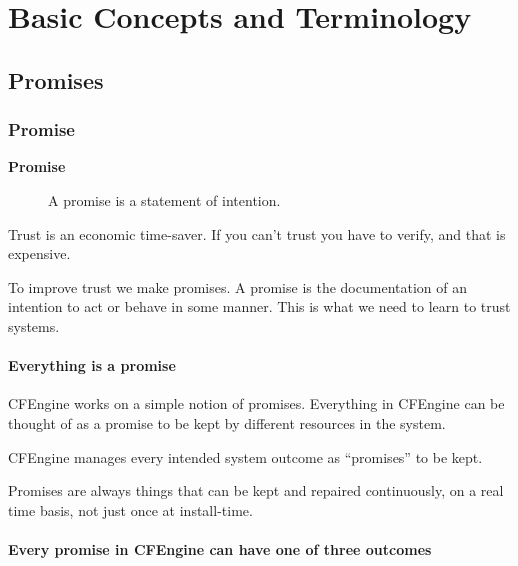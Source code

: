 



\chapter{Basic Concepts and Terminology}





\section{Promises}





\subsection{Promise}

\begin{description}
\item[\textbf{Promise}] A promise is a statement of intention.
\end{description}

Trust is an economic time-saver. If you can't trust you have to verify,
and that is expensive.

To improve trust we make promises. A promise is the documentation of
an intention to act or behave in some manner. This is what we need to
learn to trust systems.





\subsubsection{Everything is a promise}

CFEngine works on a simple notion of promises. Everything in CFEngine
can be thought of as a promise to be kept by different resources in
the system.

CFEngine manages every intended system outcome as ``promises'' to be kept.

Promises are always things that can be kept and repaired continuously,
on a real time basis, not just once at install-time.





\subsubsection{Every promise in CFEngine can have one of three outcomes}

